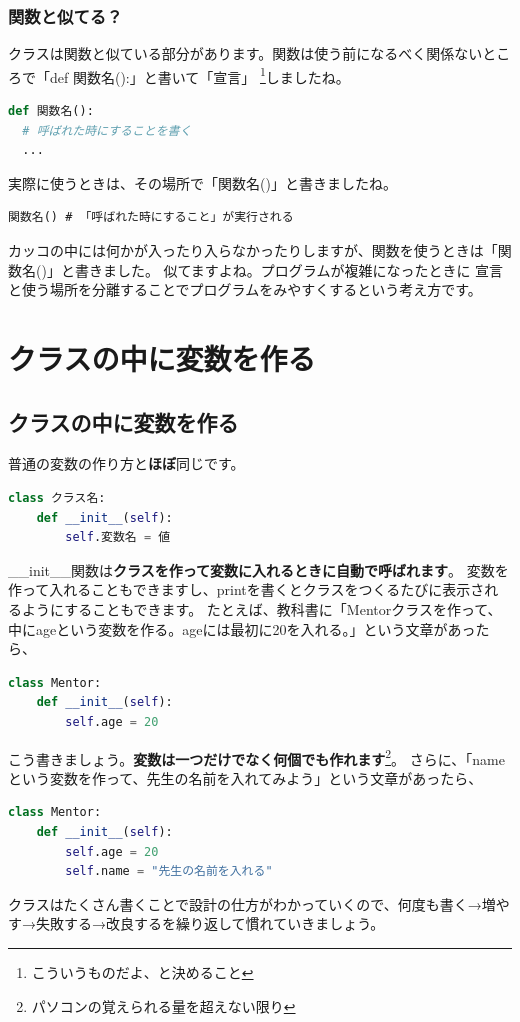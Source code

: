 \documentclass[12pt, a4paper, dvipdfmx]{book}
\begin{document}
\subsubsection{関数と似てる？}
クラスは関数と似ている部分があります。関数は使う前になるべく関係ないところで「def 関数名():」と書いて「宣言」
\footnote{こういうものだよ、と決めること}しましたね。
\begin{lstlisting}[caption=関数の作り方,label=sample, language=Python]
def 関数名():
  # 呼ばれた時にすることを書く
  ...
\end{lstlisting}
実際に使うときは、その場所で「関数名()」と書きましたね。
\begin{lstlisting}[caption=関数の呼び出し方,label=sample]
関数名() # 「呼ばれた時にすること」が実行される
\end{lstlisting}
カッコの中には何かが入ったり入らなかったりしますが、関数を使うときは「関数名()」と書きました。
似てますよね。プログラムが複雑になったときに
宣言と使う場所を分離することでプログラムをみやすくするという考え方です。

\section{クラスの中に変数を作る}
\subsection{クラスの中に変数を作る}
普通の変数の作り方と\textbf{ほぼ}同じです。
\begin{lstlisting}[caption=クラスの中に変数を作る,label=sample, language=Python]
class クラス名:
    def __init__(self):
        self.変数名 = 値
\end{lstlisting}
\_\_init\_\_関数は\textbf{クラスを作って変数に入れるときに自動で呼ばれます}。
変数を作って入れることもできますし、printを書くとクラスをつくるたびに表示されるようにすることもできます。
たとえば、教科書に「Mentorクラスを作って、中にageという変数を作る。ageには最初に20を入れる。」という文章があったら、
\begin{lstlisting}[caption=Mentorクラスの作り方,label=sample, language=Python]
class Mentor:
    def __init__(self):
        self.age = 20
\end{lstlisting}
こう書きましょう。\textbf{変数は一つだけでなく何個でも作れます}\footnote{パソコンの覚えられる量を超えない限り}。
さらに、「nameという変数を作って、先生の名前を入れてみよう」という文章があったら、
\begin{lstlisting}[caption=Mentorクラスの作り方,label=sample, language=Python]
class Mentor:
    def __init__(self):
        self.age = 20
        self.name = "先生の名前を入れる"
\end{lstlisting}
クラスはたくさん書くことで設計の仕方がわかっていくので、何度も書く→増やす→失敗する→改良するを繰り返して慣れていきましょう。
\end{document}
